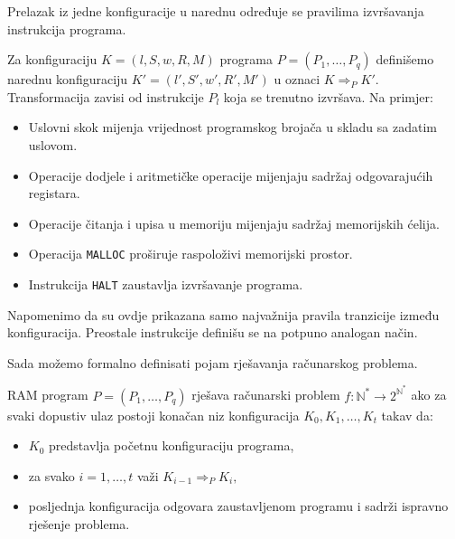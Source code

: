 Prelazak iz jedne konfiguracije u narednu određuje se pravilima izvršavanja instrukcija programa.

\begin{definition}
	Za konfiguraciju $
	K=(l,S,w,R,M)
	$ programa $
	P=(P_1,\ldots,P_q)
	$ definišemo narednu konfiguraciju $
	K'=(l',S',w',R',M')
	$ u oznaci $
	K \Rightarrow_P K'.
	$ Transformacija zavisi od instrukcije $P_l$ koja se trenutno izvršava. Na primjer:
	
	\begin{itemize}
		\item Uslovni skok mijenja vrijednost programskog brojača u skladu sa zadatim uslovom.
		
		\item Operacije dodjele i aritmetičke operacije mijenjaju sadržaj odgovarajućih registara.
		
		\item Operacije čitanja i upisa u memoriju mijenjaju sadržaj memorijskih ćelija.
		
		\item Operacija \texttt{MALLOC} proširuje raspoloživi memorijski prostor.
		
		\item Instrukcija \texttt{HALT} zaustavlja izvršavanje programa.
	\end{itemize}
\end{definition}

Napomenimo da su ovdje prikazana samo najvažnija pravila tranzicije između konfiguracija. Preostale instrukcije definišu se na potpuno analogan način.

Sada možemo formalno definisati pojam rješavanja računarskog problema.

\begin{definition}
	RAM program   $
	P=(P_1,\ldots,P_q)
	$   	rješava računarski problem $
	f:\mathbb{N}^* \rightarrow 2^{\mathbb{N}^*}
	$ ako za svaki dopustiv ulaz postoji konačan niz konfiguracija $
	K_0,K_1,\ldots,K_t
	$ takav da:
	
	\begin{itemize}
		\item $K_0$ predstavlja početnu konfiguraciju programa,
		\item za svako $i=1,\ldots,t$ važi
		$
		K_{i-1}\Rightarrow_P K_i,
		$
		\item posljednja konfiguracija odgovara zaustavljenom programu i sadrži ispravno rješenje problema.
	\end{itemize}
\end{definition}

